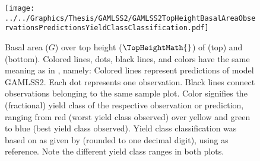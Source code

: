 \begin{figure}[h]
  \centering
  \texttt{[image: ../../Graphics/Thesis/GAMLSS2/GAMLSS2TopHeightBasalAreaObservationsPredictionsYieldClassClassification.pdf]}
  \caption{Basal area (\(G\)) over top height (\(\TopHeightMath{}\)) of \Beech{} (top) and \Spruce{} (bottom).  Colored lines, dots, black lines, and colors have the same meaning as in , namely:  Colored lines represent predictions of model GAMLSS2.  Each dot represents one observation.  Black lines connect observations belonging to the same sample plot.  Color signifies the (fractional) yield class of the respective observation or prediction, ranging from red (worst yield class observed) over yellow and green to blue (best yield class observed).  Yield class classification was based on \ProductivityIndexText{} as given by  (rounded to one decimal digit), using  as reference.  Note the different yield class ranges in both plots.}
  \label{fig:GAMLSS2TopHeightBasalAreaObservationsPredictionsYieldClassClassification}
\end{figure}

\clearpage{}

